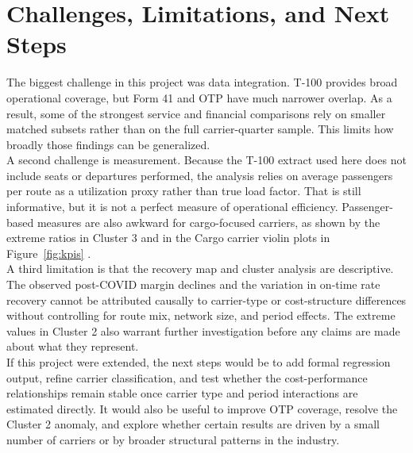 \documentclass[11pt, letterpaper]{article}
\begin{document}
\section{Challenges, Limitations, and Next Steps}

The biggest challenge in this project was data integration. T-100 provides broad operational coverage, but Form 41 and OTP have much narrower overlap. As a result, some of the strongest service and financial comparisons rely on smaller matched subsets rather than on the full carrier-quarter sample. This limits how broadly those findings can be generalized.\\
\indent A second challenge is measurement. Because the T-100 extract used here does not include seats or departures performed, the analysis relies on average passengers per route as a utilization proxy rather than true load factor. That is still informative, but it is not a perfect measure of operational efficiency. Passenger-based measures are also awkward for cargo-focused carriers, as shown by the extreme ratios in Cluster 3 and in the Cargo carrier violin plots in Figure~\ref{fig:kpis} \cite{caves1984,zuidberg2014}.\\
\indent A third limitation is that the recovery map and cluster analysis are descriptive. The observed post-COVID margin declines and the variation in on-time rate recovery cannot be attributed causally to carrier-type or cost-structure differences without controlling for route mix, network size, and period effects. The extreme values in Cluster 2 also warrant further investigation before any claims are made about what they represent.\\
\indent 
If this project were extended, the next steps would be to add formal regression output, refine carrier classification, and test whether the cost-performance relationships remain stable once carrier type and period interactions are estimated directly. It would also be useful to improve OTP coverage, resolve the Cluster 2 anomaly, and explore whether certain results are driven by a small number of carriers or by broader structural patterns in the industry.



\end{document}
